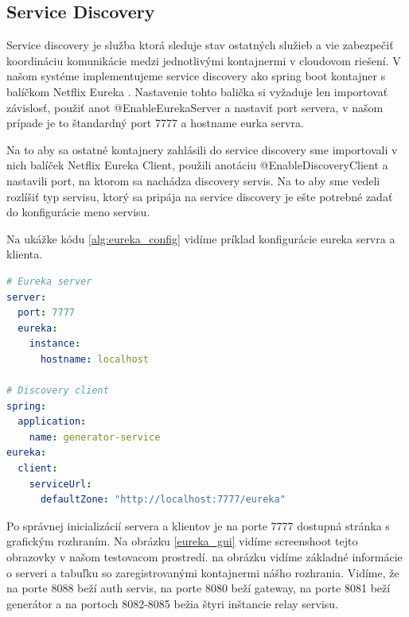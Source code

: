 \subsection{Service Discovery}
Service discovery je služba ktorá sleduje stav ostatných služieb a vie zabezpečiť koordináciu komunikácie medzi jednotlivými kontajnermi v cloudovom riešení. V našom systéme implementujeme service discovery ako spring boot kontajner s balíčkom Netflix Eureka \cite{eureka}. Nastavenie tohto balička si vyžaduje len importovať závislosť, použiť anot @EnableEurekaServer a nastaviť port servera, v našom prípade je to štandardný port 7777 a hostname eurka servra. 

Na to aby sa ostatné kontajnery zahlásili do service discovery sme importovali v nich balíček Netflix Eureka Client, použili anotáciu @EnableDiscoveryClient a nastavili port, na ktorom sa nachádza discovery servis. Na to aby sme vedeli rozlíšiť typ servisu, ktorý sa pripája na service discovery je ešte potrebné zadať do konfigurácie meno servisu.  

Na ukážke kódu \ref{alg:eureka_config} vidíme príklad konfigurácie eureka servra a klienta. 


\begin{lstlisting}[float, caption={Konfigurácia Eureka servra a klienta},label={alg:eureka_config},language=yaml]
# Eureka server
server:
  port: 7777
  eureka:
	instance:
	  hostname: localhost
			
# Discovery client	
spring:
  application:
	name: generator-service
eureka:
  client:
	serviceUrl:
	  defaultZone: "http://localhost:7777/eureka"
\end{lstlisting} 


Po správnej inicializácií servera a klientov je na porte 7777 dostupná stránka s grafickým rozhraním. Na obrázku \ref{eureka_gui} vidíme screenshoot tejto obrazovky v našom testovacom prostredí. na obrázku vidíme základné informácie o serveri a tabuľku so zaregistrovanými kontajnermi nášho rozhrania. Vidíme, že na porte 8088 beží auth servis, na porte 8080 beží gateway, na porte 8081 beží generátor a na portoch 8082-8085 bežia štyri inštancie relay servisu. 

